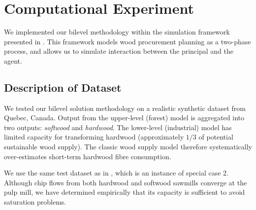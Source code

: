 \section{Computational Experiment}

We implemented our bilevel methodology within the simulation framework presented in \citet{paradis2013risk}. This framework models wood procurement planning as a two-phase process, and allows us to simulate interaction between the principal and the agent.

\subsection{Description of Dataset}

We tested our bilevel solution methodology on a realistic synthetic dataset from Quebec, Canada.
Output from the upper-level (forest) model is aggregated into two outputs: \emph{softwood} and \emph{hardwood}. 
The lower-level (industrial) model has limited capacity for transforming hardwood (approximately $1/3$ of potential sustainable wood supply). 
The classic wood supply model therefore systematically over-estimates short-term hardwood fibre consumption.


We use the same test dataset as in \citet{paradis2013risk}, which is an instance of special case 2. Although chip flows from both hardwood and softwood sawmills converge at the pulp mill, we have determined empirically that its capacity is sufficient to avoid saturation problems.


